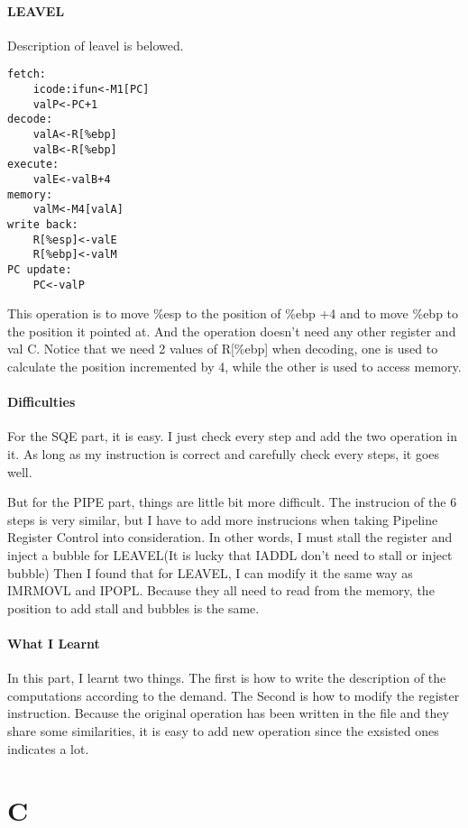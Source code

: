 \documentclass{article}
\begin{document}
\subsection{LEAVEL}
Description of leavel is belowed.
\begin{lstlisting}
fetch:
    icode:ifun<-M1[PC]
    valP<-PC+1
decode:
    valA<-R[%ebp]
    valB<-R[%ebp]
execute:
    valE<-valB+4
memory:
    valM<-M4[valA]
write back:
    R[%esp]<-valE
    R[%ebp]<-valM
PC update:
    PC<-valP
\end{lstlisting}
This operation is to move \%esp to the position of \%ebp +4 and to move \%ebp to the position it pointed at.
And the operation doesn't need any other register and val C.  
Notice that we need 2 values of R[\%ebp] when decoding, one is used to calculate the position incremented by 4, while the other
is used to access memory.
\subsection{Difficulties}
For the SQE part, it is easy. I just check every step and add the two operation in it. As long as my instruction is correct and carefully check 
every steps, it goes well.

But for the PIPE part, things are little bit more difficult. The instrucion of the 6 steps is very similar, but I have to add more instrucions when taking
Pipeline Register Control into consideration. In other words, I must stall the register and inject a bubble for LEAVEL(It is lucky that IADDL don't need to stall or inject bubble)
Then I found that for LEAVEL, I can modify it the same way as IMRMOVL and IPOPL. Because they all need to read from the memory, the position to add stall and bubbles is the same. 
\subsection{What I Learnt}
In this part, I learnt two things. The first is how to write the description of the computations according to the demand. The Second is how to modify the register instruction.
Because the original operation has been written in the file and they share some similarities, it is easy to add new operation since the exsisted ones indicates a lot.

\part{C}
\setcounter{section}{0}
\end{document}
